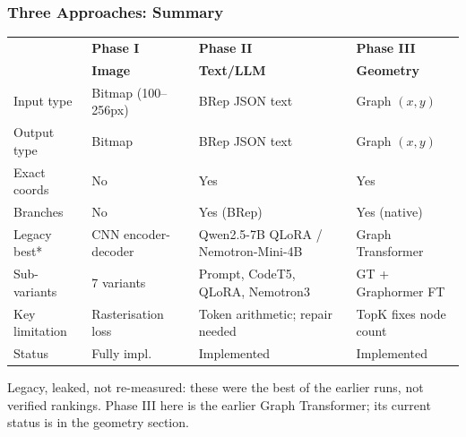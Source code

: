 
\begin{frame}[fragile]\frametitle{Three Approaches: Summary}

\begin{center}
\small
\begin{tabular}{@{}p{1.8cm}p{2.2cm}p{2.0cm}p{2.2cm}@{}}
\toprule
 & \textbf{Phase I} & \textbf{Phase II} & \textbf{Phase III} \\
 & \textbf{Image} & \textbf{Text/LLM} & \textbf{Geometry} \\
\midrule
Input type      & Bitmap (100--256px) & BRep JSON text & Graph $(x,y)$ \\
Output type     & Bitmap             & BRep JSON text & Graph $(x,y)$ \\
Exact coords    & No                 & Yes            & Yes \\
Branches        & No                 & Yes (BRep)     & Yes (native) \\
Legacy best*    & CNN encoder-decoder & Qwen2.5-7B QLoRA / Nemotron-Mini-4B & Graph Transformer \\
Sub-variants    & 7 variants         & Prompt, CodeT5, QLoRA, Nemotron3  & GT + Graphormer FT \\
Key limitation  & Rasterisation loss & Token arithmetic; repair needed & TopK fixes node count \\
Status          & Fully impl.        & Implemented    & Implemented \\
\bottomrule
\end{tabular}
\end{center}

\vspace{2pt}
{\footnotesize *Legacy, leaked, not re-measured: these were the best of the earlier runs, not verified rankings. Phase III here is the earlier Graph Transformer; its current status is in the geometry section.}
\end{frame}

